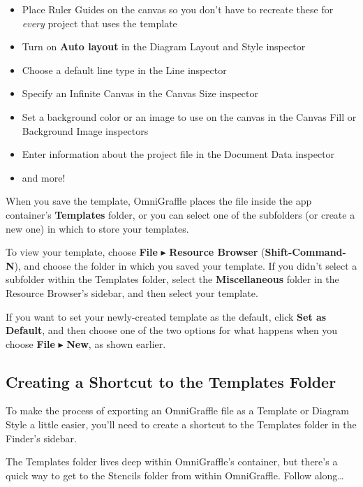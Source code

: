 \documentclass[../main.tex]{subfiles}
\begin{document}
\begin{itemize}
  \item Place Ruler Guides on the canvas so you don't have to recreate these for \textit{every}
    project that uses the template
  \item Turn on \textbf{Auto layout} in the Diagram Layout and Style inspector
  \item Choose a default line type in the Line inspector
  \item Specify an Infinite Canvas in the Canvas Size inspector
  \item Set a background color or an image to use on the canvas in the Canvas Fill or Background
    Image inspectors
  \item Enter information about the project file in the Document Data inspector
  \item and more!
\end{itemize}

When you save the template, OmniGraffle places the file inside the app container's
\textbf{Templates} folder, or you can select one of the subfolders (or create a new one) in
which to store your templates.


To view your template, choose \textbf{File} $\blacktriangleright$ \textbf{Resource Browser}
(\textbf{Shift-Command-N}), and choose the folder in which you saved your template. If you
didn't select a subfolder within the Templates folder, select the \textbf{Miscellaneous}
folder in the Resource Browser's sidebar, and then select your template.


If you want to set your newly-created template as the default, click \textbf{Set as Default},
and then choose one of the two options for what happens when you choose \textbf{File}
$\blacktriangleright$ \textbf{New}, as shown earlier.

\subsection{Creating a Shortcut to the Templates Folder}

To make the process of exporting an OmniGraffle file as a Template or Diagram Style a little
easier, you'll need to create a shortcut to the Templates folder in the Finder's sidebar.

The Templates folder lives deep within OmniGraffle's container, but there's a quick way to get
to the Stencils folder from within OmniGraffle. Follow along\ldots{}
\end{document}
